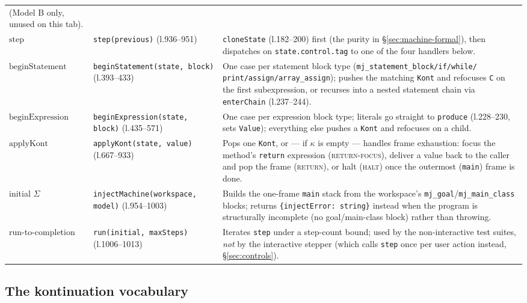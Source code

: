 \documentclass[11pt]{article}
\newcommand{\rulename}[1]{\textsc{#1}}
\begin{document}
\begin{center}
\begin{longtable}{@{}p{2.6cm}p{4.6cm}p{7.0cm}@{}}
  (Model B only, unused on this tab). \\
$\mathrm{step}$ &
  \texttt{step(previous)} (l.936--951) &
  \texttt{cloneState} (l.182--200) first (the purity in
  \S\ref{sec:machine-formal}), then dispatches on \texttt{state.control.tag}
  to one of the four handlers below. \\
$\mathrm{beginStatement}$ &
  \texttt{beginStatement(state, block)} (l.393--433) &
  One case per statement block type (\texttt{mj\_statement\_block/if/while/
  print/assign/array\_assign}); pushes the matching \texttt{Kont} and
  refocuses \texttt{C} on the first subexpression, or recurses into a
  nested statement chain via \texttt{enterChain} (l.237--244). \\
$\mathrm{beginExpression}$ &
  \texttt{beginExpression(state, block)} (l.435--571) &
  One case per expression block type; literals go straight to
  \texttt{produce} (l.228--230, sets \texttt{Value}); everything else
  pushes a \texttt{Kont} and refocuses on a child. \\
$\mathrm{applyKont}$ &
  \texttt{applyKont(state, value)} (l.667--933) &
  Pops one \texttt{Kont}, or --- if $\kappa$ is empty --- handles frame
  exhaustion: focus the method's \texttt{return} expression
  (\rulename{return-focus}), deliver a value back to the caller and pop the
  frame (\rulename{return}), or halt (\rulename{halt}) once the outermost
  (\texttt{main}) frame is done. \\
initial $\Sigma$ &
  \texttt{injectMachine(workspace, model)} (l.954--1003) &
  Builds the one-frame \texttt{main} stack from the workspace's
  \texttt{mj\_goal}/\texttt{mj\_main\_class} blocks; returns
  \texttt{\{injectError: string\}} instead when the program is structurally
  incomplete (no goal/main-class block) rather than throwing. \\
run-to-completion &
  \texttt{run(initial, maxSteps)} (l.1006--1013) &
  Iterates \texttt{step} under a step-count bound; used by the
  non-interactive test suites, \emph{not} by the interactive stepper (which
  calls \texttt{step} once per user action instead, \S\ref{sec:controls}). \\
\bottomrule
\end{longtable}
\end{center}

\subsection{The kontinuation vocabulary}
\label{sec:kont-table}
\end{document}
